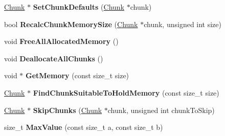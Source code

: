 \begin{DoxyCompactItemize}
\item 
\hypertarget{class_cobra_1_1internal_1_1_memory_pool_a480d739b07e3ab05d36cef22f24734a4}{\hyperlink{struct_cobra_1_1internal_1_1_chunk}{Chunk} $\ast$ {\bfseries Set\+Chunk\+Defaults} (\hyperlink{struct_cobra_1_1internal_1_1_chunk}{Chunk} $\ast$chunk)}\label{class_cobra_1_1internal_1_1_memory_pool_a480d739b07e3ab05d36cef22f24734a4}

\item 
\hypertarget{class_cobra_1_1internal_1_1_memory_pool_a3d9344dae8c65b8fb34d4ac64d697c93}{bool {\bfseries Recalc\+Chunk\+Memory\+Size} (\hyperlink{struct_cobra_1_1internal_1_1_chunk}{Chunk} $\ast$chunk, unsigned int size)}\label{class_cobra_1_1internal_1_1_memory_pool_a3d9344dae8c65b8fb34d4ac64d697c93}

\item 
\hypertarget{class_cobra_1_1internal_1_1_memory_pool_ad2780b731df4fb9aaa8d8292c3104605}{void {\bfseries Free\+All\+Allocated\+Memory} ()}\label{class_cobra_1_1internal_1_1_memory_pool_ad2780b731df4fb9aaa8d8292c3104605}

\item 
\hypertarget{class_cobra_1_1internal_1_1_memory_pool_a272cf9059938fa1a65741b27f5b54e8e}{void {\bfseries Deallocate\+All\+Chunks} ()}\label{class_cobra_1_1internal_1_1_memory_pool_a272cf9059938fa1a65741b27f5b54e8e}

\item 
\hypertarget{class_cobra_1_1internal_1_1_memory_pool_af3be63f4704a05a97846740bcf0729e0}{void $\ast$ {\bfseries Get\+Memory} (const size\+\_\+t size)}\label{class_cobra_1_1internal_1_1_memory_pool_af3be63f4704a05a97846740bcf0729e0}

\item 
\hypertarget{class_cobra_1_1internal_1_1_memory_pool_ac44c2f5675c6bfc326074239a3b1b7a2}{\hyperlink{struct_cobra_1_1internal_1_1_chunk}{Chunk} $\ast$ {\bfseries Find\+Chunk\+Suitable\+To\+Hold\+Memory} (const size\+\_\+t size)}\label{class_cobra_1_1internal_1_1_memory_pool_ac44c2f5675c6bfc326074239a3b1b7a2}

\item 
\hypertarget{class_cobra_1_1internal_1_1_memory_pool_aeefac13914152fa0e7e5af3196815e43}{\hyperlink{struct_cobra_1_1internal_1_1_chunk}{Chunk} $\ast$ {\bfseries Skip\+Chunks} (\hyperlink{struct_cobra_1_1internal_1_1_chunk}{Chunk} $\ast$chunk, unsigned int chunk\+To\+Skip)}\label{class_cobra_1_1internal_1_1_memory_pool_aeefac13914152fa0e7e5af3196815e43}

\item 
\hypertarget{class_cobra_1_1internal_1_1_memory_pool_a8704781a8f1e92105543af368fd115c2}{size\+\_\+t {\bfseries Max\+Value} (const size\+\_\+t a, const size\+\_\+t b)}\label{class_cobra_1_1internal_1_1_memory_pool_a8704781a8f1e92105543af368fd115c2}


\end{DoxyCompactItemize}
